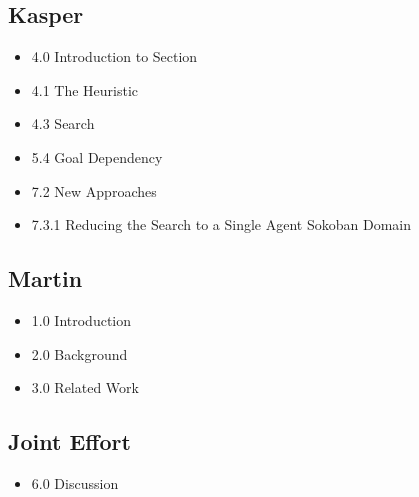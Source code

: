 \documentclass[10pt,a4paper]{article}
\begin{document}
	\subsection{Kasper}
		\begin{itemize}
			\item 4.0 Introduction to Section
			\item 4.1 The Heuristic
			\item 4.3 Search
			\item 5.4 Goal Dependency
			\item 7.2 New Approaches
			\item 7.3.1 Reducing the Search to a Single Agent Sokoban Domain
		\end{itemize}
	\subsection{Martin}
		\begin{itemize}
			\item 1.0 Introduction
			\item 2.0 Background
			\item 3.0 Related Work
		\end{itemize}

	\subsection{Joint Effort}
		\begin{itemize}
			\item 6.0 Discussion
		\end{itemize}
\end{document}
